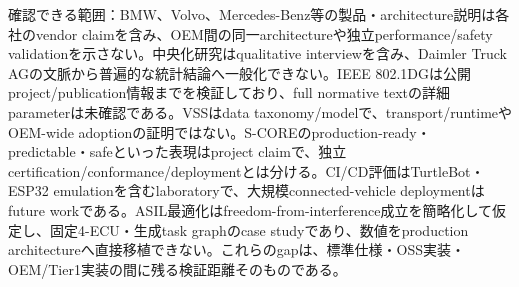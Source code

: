 \begin{claimboundary}
確認できる範囲：BMW、Volvo、Mercedes-Benz等の製品・architecture説明は各社のvendor claimを含み、OEM間の同一architectureや独立performance/safety validationを示さない。中央化研究はqualitative interviewを含み、Daimler Truck AGの文脈から普遍的な統計結論へ一般化できない。IEEE 802.1DGは公開project/publication情報までを検証しており、full normative textの詳細parameterは未確認である。VSSはdata taxonomy/modelで、transport/runtimeやOEM-wide adoptionの証明ではない。S-COREのproduction-ready・predictable・safeといった表現はproject claimで、独立certification/conformance/deploymentとは分ける。CI/CD評価はTurtleBot・ESP32 emulationを含むlaboratoryで、大規模connected-vehicle deploymentはfuture workである。ASIL最適化はfreedom-from-interference成立を簡略化して仮定し、固定4-ECU・生成task graphのcase studyであり、数値をproduction architectureへ直接移植できない。これらのgapは、標準仕様・OSS実装・OEM/Tier1実装の間に残る検証距離そのものである。\autocite{src-0d68a9a04e3d,src-1486b9718088,src-3ce752187789,src-4e0a35202b0f,src-971a21882f71,src-c89d0f167c6b,src-d5d5a7ec3f4c,src-d63061aaba8e,src-e24ad9438abe,src-e71ad506dc03,src-f657aea94b5e}
\end{claimboundary}
